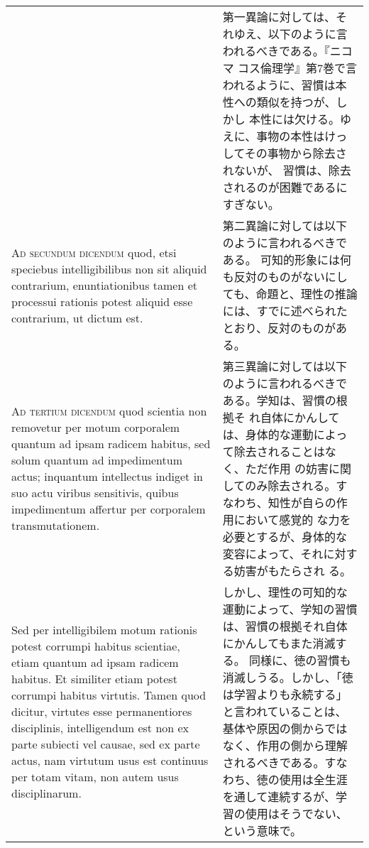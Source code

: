 \documentclass[10pt]{jsarticle} %
\begin{document}
\begin{longtable}{p{21em}p{21em}}
&

第一異論に対しては、それゆえ、以下のように言われるべきである。『ニコマ
コス倫理学』第7巻で言われるように、習慣は本性への類似を持つが、しかし
本性には欠ける。ゆえに、事物の本性はけっしてその事物から除去されないが、
習慣は、除去されるのが困難であるにすぎない。

\\



{\scshape Ad secundum dicendum} quod, etsi speciebus intelligibilibus non sit
aliquid contrarium, enuntiationibus tamen et processui rationis potest
aliquid esse contrarium, ut dictum est.


&

第二異論に対しては以下のように言われるべきである。
可知的形象には何も反対のものがないにしても、命題と、理性の推論には、すでに述べられたとおり、反対のものがある。

\\



{\scshape Ad tertium dicendum} quod scientia non removetur per motum corporalem
quantum ad ipsam radicem habitus, sed solum quantum ad impedimentum
actus; inquantum intellectus indiget in suo actu viribus sensitivis,
quibus impedimentum affertur per corporalem transmutationem. 


&

第三異論に対しては以下のように言われるべきである。学知は、習慣の根拠そ
れ自体にかんしては、身体的な運動によって除去されることはなく、ただ作用
の妨害に関してのみ除去される。すなわち、知性が自らの作用において感覚的
な力を必要とするが、身体的な変容によって、それに対する妨害がもたらされ
る。

\\


Sed per
intelligibilem motum rationis potest corrumpi habitus scientiae, etiam
quantum ad ipsam radicem habitus. Et similiter etiam potest corrumpi
habitus virtutis. Tamen quod dicitur, virtutes esse permanentiores
disciplinis, intelligendum est non ex parte subiecti vel causae, sed
ex parte actus, nam virtutum usus est continuus per totam vitam, non
autem usus disciplinarum.


&

しかし、理性の可知的な運動によって、学知の習慣は、習慣の根拠それ自体にかんしてもまた消滅する。
同様に、徳の習慣も消滅しうる。しかし、「徳は学習よりも永続する」と言われていることは、基体や原因の側からではなく、作用の側から理解されるべきである。すなわち、徳の使用は全生涯を通して連続するが、学習の使用はそうでない、という意味で。

\end{longtable}
\end{document}

